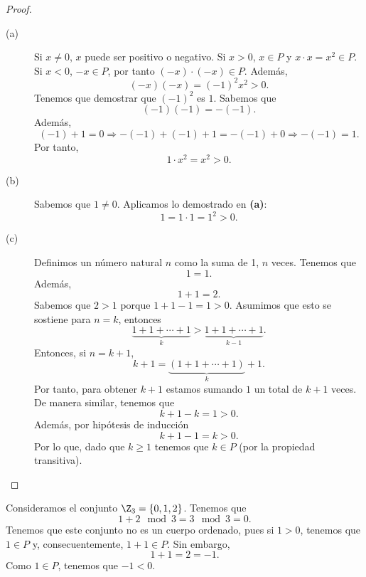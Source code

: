 \begin{proof}
\begin{description}
\item[(a)] Si $\displaystyle x \neq 0 $, $\displaystyle x $ puede ser positivo o negativo. Si $\displaystyle x>0 $, $\displaystyle x \in P $ y $\displaystyle x \cdot x = x^{2} \in P $. Si $\displaystyle x<0 $, $\displaystyle -x \in P $, por tanto $\displaystyle \left(-x\right) \cdot \left(- x\right)\in P $. Además, 
	\[\left(-x\right)\left(-x\right) = \left(-1\right)^{2}x^{2}>0 .\]
Tenemos que demostrar que $\displaystyle \left(-1\right)^{2} $ es $\displaystyle 1 $. Sabemos que
\[\left(-1\right)\left(-1\right) = -\left(-1\right) .\]
Además, 
\[\left(-1\right) + 1 = 0 \Rightarrow -\left(-1\right)+\left(-1\right)+1 = -\left(-1\right)+0 \Rightarrow -\left(-1\right) = 1 .\]
Por tanto, 
\[1 \cdot x^{2} = x^{2} > 0 .\]

\item[(b)] Sabemos que $\displaystyle 1 \neq 0 $. Aplicamos lo demostrado en \textbf{(a)}:
	\[1 = 1 \cdot 1 = 1^{2} >0 .\]
\item[(c)] Definimos un número natural $\displaystyle n $ como la suma de 1, $\displaystyle n $ veces. Tenemos que 
	\[1 = 1 .\]
Además, 
\[1 + 1 = 2 .\]
Sabemos que $\displaystyle 2>1 $ porque $\displaystyle 1+1-1 = 1 > 0 $. Asumimos que esto se sostiene para $\displaystyle n = k $, entonces
\[\underbrace{1+1+\cdots+1}_{k}>\underbrace{1 + 1 + \cdots + 1}_{k-1} .\]
Entonces, si $\displaystyle n = k+1 $, 
\[k + 1 = \underbrace{\left(1 + 1+ \cdots + 1\right)}_{k} + 1 .\]
Por tanto, para obtener $\displaystyle k+1 $ estamos sumando $\displaystyle 1 $ un total de $\displaystyle k+ 1 $ veces. De manera similar, tenemos que 
\[k + 1 - k = 1 > 0.\]
Además, por hipótesis de inducción
\[k+1-1 = k > 0 .\]
Por lo que, dado que $\displaystyle k \geq 1 $ tenemos que $\displaystyle k \in P $ (por la propiedad transitiva). 
\end{description}
\end{proof}

\begin{eg}
	\normalfont Consideramos el conjunto $\displaystyle \Z_{3} =  \left\{ 0, 1, 2\right\}  $. Tenemos que 
	\[1 + 2 \mod 3 = 3 \mod 3 = 0 .\]
Tenemos que este conjunto no es un cuerpo ordenado, pues si $\displaystyle 1 > 0 $, tenemos que $\displaystyle 1 \in P $ y, consecuentemente, $\displaystyle 1 + 1 \in P $. Sin embargo, 
\[1 + 1 = 2 = -1 .\]
Como $\displaystyle 1 \in P $, tenemos que $\displaystyle -1 <0 $. 
\end{eg}

